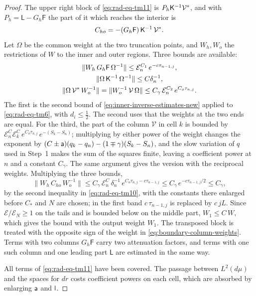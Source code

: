 \begin{proof}
The upper right block of \eqref{eq:rad-eq-tm11} is
$P_h\mathsf K^{-1}\mathcal V^*$, and with $P_h=\mathsf L-G_h\mathsf F$ the
part of it which reaches the interior is
\[
 C_{ho}=-(G_h\mathsf F)\,\mathsf K^{-1}\,\mathcal V^* .
\]
Let $\Omega$ be the common weight at the two truncation points, and
$W_h,W_o$ the restrictions of $W$ to the inner and outer regions.
Three bounds are available:
\begin{equation}\label{eq:boundary-column-weights}
 \begin{gathered}
 \|W_h\,G_h\mathsf F\,\Omega^{-1}\|
       \le\mathcal E_n^{C_1}\,e^{-c\tau_{n-1,j}},\\
 \|\Omega\,\mathsf K^{-1}\,\Omega^{-1}\|\le C\delta_n^{-1},\\
 \|\Omega\,\mathcal V^*\,W_o^{-1}\|
       =\|W_o^{-1}\,\mathcal V\,\Omega\|
       \le C_\gamma\,\mathcal E_n^{C_2}\,e^{C_o\tau_{n,j}} .
 \end{gathered}
\end{equation}
The first is the second bound of
\eqref{eq:inner-inverse-estimates-new} applied to
\eqref{eq:rad-eq-tm6}, with $d_i\le\tfrac12$. The second uses that the
weights at the two ends are equal. For the third, the part of the
column $\mathcal V$ in cell $k$ is bounded by
$\mathcal E_n^C\mathcal E_k^C\,e^{C_o\tau_{n,j}}\,e^{-(S_k-S_n)}$;
multiplying by either power of the weight changes the exponent by
$(C\pm\mathsf a)(q_k-q_n)-(1\mp\gamma)(S_k-S_n)$, and the slow variation of
$q$ used in Step~1 makes the sum of the squares finite, leaving a
coefficient power at $n$ and a constant $C_\gamma$. The same argument
gives the version with the reciprocal weights. Multiplying the three
bounds,
\begin{equation}\label{eq:one-boundary-cross-block}
 \|W_h\,C_{ho}\,W_o^{-1}\|
 \le C_\gamma\,\mathcal E_n^C\,\delta_n^{-1}\,
             e^{C_o\tau_{n,j}-c\tau_{n-1,j}}
 \le C_\gamma\,e^{-c\tau_{n-1,j}/2}\le C_\gamma ,
\end{equation}
by the second inequality in \eqref{eq:rad-eq-tm10}, with the constants
there enlarged before $C_*$ and $N$ are chosen; in the first band
$c\,\tau_{n-1,j}$ is replaced by $c\,jL$. Since
$\mathcal E/\mathcal E_N\ge1$ on the tails and is bounded below on the
middle part, $W_1\le C\,W$, which gives the bound with the output
weight $W_1$. The transposed block is treated with the opposite sign
of the weight in \eqref{eq:boundary-column-weights}. Terms with two
columns $G_h\mathsf F$ carry two attenuation factors, and terms with
one such column and one leading part $\mathsf L$ are estimated in the
same way.

All terms of \eqref{eq:rad-eq-tm11} have been covered. The passage
between $L^2(d\mu)$ and the spaces for $dr$ costs coefficient powers
on each cell, which are absorbed by enlarging $\mathsf a$ and $\mathsf l$.
\end{proof}

